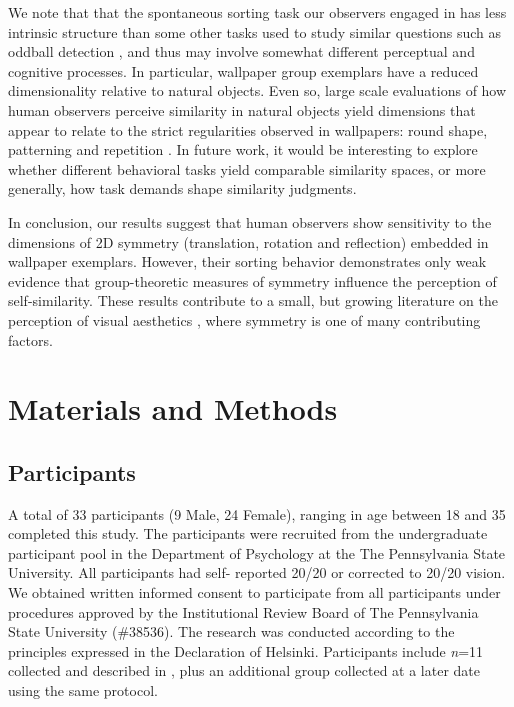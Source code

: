 \documentclass[symmetry,article,accept,pdftex,moreauthors]{Definitions/mdpi}
\begin{document}
We note that that the spontaneous sorting task our observers engaged in has less intrinsic structure than some other tasks used to study similar questions such as oddball detection \citep{RN1253,Hebart2020-so,Landwehr2011-kg}, and thus may involve somewhat different perceptual and cognitive processes. In particular, wallpaper group exemplars have a reduced dimensionality relative to natural objects. Even so, large scale evaluations of how human observers perceive similarity in natural objects yield dimensions that appear to relate to the strict regularities observed in wallpapers: round shape, patterning and repetition \citep{Hebart2020-so}. In future work, it would be interesting to explore whether different behavioral tasks yield comparable similarity spaces, or more generally, how task demands shape similarity judgments.

In conclusion, our results suggest that human observers show sensitivity to the dimensions of 2D symmetry (translation, rotation and reflection) embedded in wallpaper exemplars. However, their sorting behavior demonstrates only weak evidence that group-theoretic measures of symmetry influence the perception of self-similarity. These results contribute to a small, but growing literature on the perception of visual aesthetics \citep{Carneiro2012-ph,Graham2010-yf,Friedenberg2012-gf,Laine-Hernandez2008-sg,Richards1972-gl}, where symmetry is one of many contributing factors.

\section{Materials and Methods}
\label{methods}

\subsection{Participants}
A total of 33 participants (9 Male, 24 Female), ranging in age between 18 and 35 completed this study. The participants were recruited from the undergraduate participant pool in the Department of Psychology at the The Pennsylvania State University. All participants had self- reported 20/20 or corrected to 20/20 vision. We obtained written informed consent to participate from all participants under procedures approved by the Institutional Review Board of The Pennsylvania State University (\#38536). The research was conducted according to the principles expressed in the Declaration of Helsinki. Participants include \textit{n}=11 collected and described in \citep{vedak_thesis}, plus an additional group collected at a later date using the same protocol.
\end{document}
